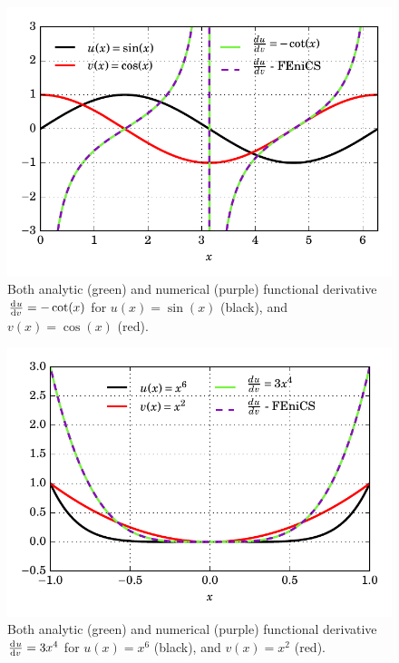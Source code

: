   \begin{figure}
    \centering
      \includegraphics[width=\linewidth]{images/fenics_intro/1D_dir_dir_1.pdf}
    \caption[Functional derivative example one solution]{Both analytic (green) and numerical (purple) functional derivative $\frac{\mathrm{d}^{} u}{\mathrm{d} v^{} } = -\cot(x)$ for $u(x) = \sin(x)$ (black), and $v(x) = \cos(x)$ (red).}
    \label{1d_dir_dir_1_image}
  \end{figure}

  
  \begin{figure}
    \centering
      \includegraphics[width=\linewidth]{images/fenics_intro/1D_dir_dir_2.pdf}
    \caption[Functional derivative example two solution]{Both analytic (green) and numerical (purple) functional derivative $\frac{\mathrm{d}^{} u}{\mathrm{d} v^{} } = 3x^4$ for $u(x) = x^6$ (black), and $v(x) = x^2$ (red).}
    \label{1d_dir_dir_2_image}
  \end{figure}

